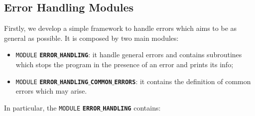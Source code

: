 \documentclass[rmp,10pt,onecolumn,fleqn,notitlepage]{revtex4-1}
\begin{document}
\subsection{Error Handling Modules}
Firstly, we develop a simple framework to handle errors which aims to be as general as possible. It is composed by two main modules:
\begin{itemize}
\item \texttt{MODULE} {\bfseries\texttt{ERROR$\_$HANDLING}}: it handle general errors and contains subroutines which stops the program in the presence of an error and prints its info;
\item \texttt{MODULE} {\bfseries\texttt{ERROR$\_$HANDLING$\_$COMMON$\_$ERRORS}}: it contains the definition of common errors which may arise.
\end{itemize}
In particular, the \texttt{MODULE} {\bfseries\texttt{ERROR$\_$HANDLING}} contains:
\end{document}
